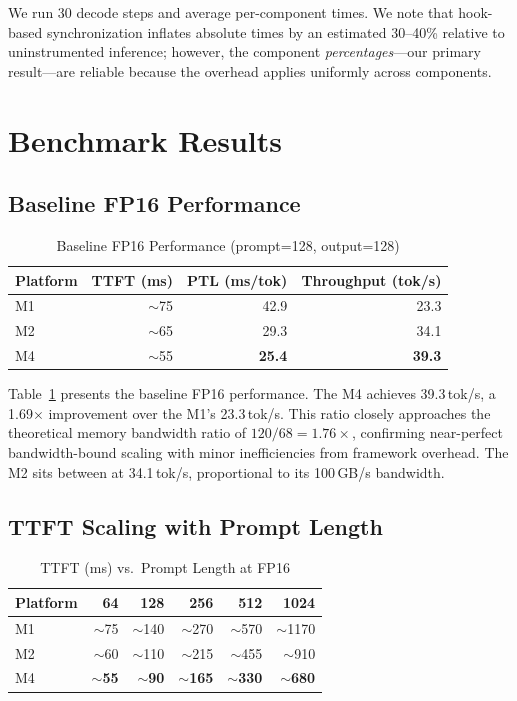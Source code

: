 \documentclass[conference]{IEEEtran}
\begin{document}
We run 30 decode steps and average per-component times. We note that hook-based synchronization inflates absolute times by an estimated 30--40\% relative to uninstrumented inference; however, the component \emph{percentages}---our primary result---are reliable because the overhead applies uniformly across components.

\section{Benchmark Results}

\subsection{Baseline FP16 Performance}

\begin{table}[t]
\caption{Baseline FP16 Performance (\mbox{prompt=128}, \mbox{output=128})}
\label{tab:f16_baseline}
\centering
\small
\begin{tabular}{lrrr}
\toprule
\textbf{Platform} & \textbf{TTFT (ms)} & \textbf{PTL (ms/tok)} & \textbf{Throughput (tok/s)} \\
\midrule
M1 & $\sim$75  & 42.9 & 23.3 \\
M2 & $\sim$65  & 29.3 & 34.1 \\
M4 & $\sim$55  & \textbf{25.4} & \textbf{39.3} \\
\bottomrule
\end{tabular}
\end{table}

Table~\ref{tab:f16_baseline} presents the baseline FP16 performance. The M4 achieves 39.3\,tok/s, a 1.69$\times$ improvement over the M1's 23.3\,tok/s. This ratio closely approaches the theoretical memory bandwidth ratio of $120/68 = 1.76\times$, confirming near-perfect bandwidth-bound scaling with minor inefficiencies from framework overhead. The M2 sits between at 34.1\,tok/s, proportional to its 100\,GB/s bandwidth.

\subsection{TTFT Scaling with Prompt Length}

\begin{table}[t]
\caption{TTFT (ms) vs.\ Prompt Length at FP16}
\label{tab:ttft_scaling}
\centering
\small
\begin{tabular}{lrrrrr}
\toprule
\textbf{Platform} & \textbf{64} & \textbf{128} & \textbf{256} & \textbf{512} & \textbf{1024} \\
\midrule
M1 & $\sim$75  & $\sim$140 & $\sim$270 & $\sim$570  & $\sim$1170 \\
M2 & $\sim$60  & $\sim$110 & $\sim$215 & $\sim$455  & $\sim$910 \\
M4 & $\sim$\textbf{55} & $\sim$\textbf{90} & $\sim$\textbf{165} & $\sim$\textbf{330} & $\sim$\textbf{680} \\
\bottomrule
\end{tabular}
\end{table}
\end{document}
